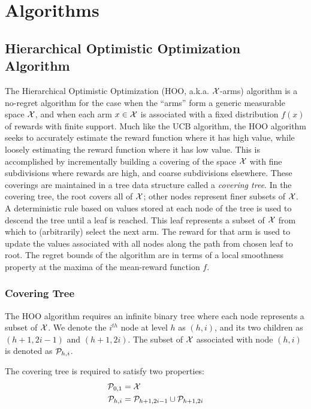 \section{Algorithms}
\subsection{Hierarchical Optimistic Optimization Algorithm}

The Hierarchical Optimistic Optimization (HOO, a.k.a. ${\mathcal{X}}$-arms)
algorithm is a no-regret algorithm for the case when the ``arms'' form
a generic measurable space ${\mathcal{X}}$, and when each arm $x \in {\mathcal{X}}$ is
associated with a fixed distribution $f(x)$ of rewards with finite
support. Much like the UCB algorithm, the HOO algorithm seeks to
accurately estimate the reward function where it has high value, while
loosely estimating the reward function where it has low value. This is
accomplished by incrementally building a covering of the space ${\mathcal{X}}$
with fine subdivisions where rewards are high, and coarse subdivisions
elsewhere. These coverings are maintained in a tree data structure
called a \emph{covering tree}. In the covering tree, the root covers
all of ${\mathcal{X}}$; other nodes represent finer subsets of ${\mathcal{X}}$. A
deterministic rule based on values stored at each node of the tree is
used to descend the tree until a leaf is reached. This leaf represents
a subset of ${\mathcal{X}}$ from which to (arbitrarily) select the next arm. The
reward for that arm is used to update the values associated with all
nodes along the path from chosen leaf to root. The regret bounds of
the algorithm are in terms of a local smoothness property at the
maxima of the mean-reward function $f$.

\subsubsection{Covering Tree}\label{sss:coverTree}
The HOO algorithm requires an infinite binary tree where each node
represents a subset of ${\mathcal{X}}$. We denote the $i^{th}$ node at level
$h$ as $(h,i)$, and its two children as $(h+1, 2i-1)$ and $(h+1,
2i)$. The subset of ${\mathcal{X}}$ associated with node $(h,i)$ is denoted
as ${\mathcal{P}}_{h,i}$.

The covering tree is required to satisfy two properties:
\begin{align*}
  {\mathcal{P}}_{0,1} &= {\mathcal{X}}\\
  {\mathcal{P}}_{h,i} &= {\mathcal{P}}_{h+1,2i-1} \cup {\mathcal{P}}_{h+1,2i}
\end{align*}

